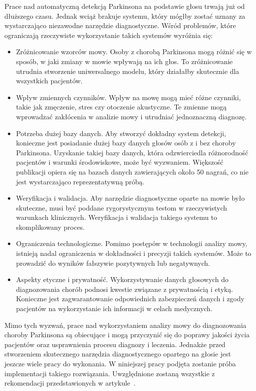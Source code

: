 Prace nad automatyczną detekcją Parkinsona na podstawie głosu trwają już od dłuższego czasu.
Jednak wciąż brakuje systemu, który mógłby zostać uznany za wystarczająco niezawodne narzędzie diagnostyczne.
Wśród problemów, które ograniczają rzeczywiste wykorzystanie takich systemów wyróżnia się:
\begin{itemize}[itemsep=0.1pt]
	\item Zróżnicowanie wzorców mowy.
Osoby z chorobą Parkinsona mogą różnić się w sposób, w jaki zmiany w mowie wpływają na ich głos.
To zróżnicowanie utrudnia stworzenie uniwersalnego modelu, który działałby skutecznie dla wszystkich pacjentów.
	\item Wpływ zmiennych czynników. Wpływ na mowę mogą mieć różne czynniki, takie jak zmęczenie, stres czy otoczenie akustyczne.
Te zmienne mogą wprowadzać zakłócenia w analizie mowy i utrudniać jednoznaczną diagnozę.
	\item Potrzeba dużej bazy danych.
Aby stworzyć dokładny system detekcji, konieczne jest posiadanie dużej bazy danych głosów osób z i
bez choroby Parkinsona.
Uzyskanie takiej bazy danych, która odzwierciedla różnorodność pacjentów i warunki środowiskowe, może być wyzwaniem.
Większość publikacji opiera się na bazach danych zawierających około 50 nagrań, co nie jest wystarczająco reprezentatywną próbą.
	\item Weryfikacja i walidacja.
	Aby narzędzie diagnostyczne oparte na mowie było skuteczne, musi być poddane rygorystycznym testom w rzeczywistych
warunkach klinicznych.
Weryfikacja i walidacja takiego systemu to skomplikowany proces.
	\item Ograniczenia technologiczne.
	Pomimo postępów w technologii analizy mowy, istnieją nadal ograniczenia w dokładności i precyzji takich systemów.
Może to prowadzić do wyników fałszywie pozytywnych lub negatywnych.
	\item Aspekty etyczne i prywatność. Wykorzystywanie danych głosowych do diagnozowania chorób podnosi kwestie związane z prywatnością i etyką.
Konieczne jest zagwarantowanie odpowiednich zabezpieczeń danych i zgody pacjentów na wykorzystanie ich informacji w celach medycznych.
\end{itemize}

Mimo tych wyzwań, prace nad wykorzystaniem analizy mowy do diagnozowania choroby Parkinsona są obiecujące i mogą przyczynić się do poprawy jakości życia
pacjentów oraz usprawnienia procesu diagnozy i leczenia.
Jednakże przed stworzeniem skutecznego narzędzia diagnostycznego opartego na głosie jest jeszcze wiele pracy do wykonania.
W niniejszej pracy podjęta zostanie próba implementacji takiego rozwiązania.
Uwzględnione zostaną wszystkie z rekomendacji przedstawionych w artykule~\cite{SustainedVowelsProblems}.